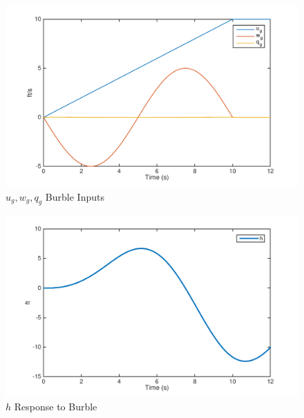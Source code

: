 \documentclass[12pt]{article}
\begin{document}
\begin{figure}[h!]
\begin{center}
\includegraphics[height=.4\textheight]{figures/1_gusts}
\caption{$u_g, w_g, q_g$ Burble Inputs}
\end{center}
\end{figure}

\begin{figure}[h!]
\begin{center}
\includegraphics[height=.4\textheight]{figures/1_h}
\caption{$h$ Response to Burble}
\end{center}
\end{figure}


\clearpage
\end{document}
